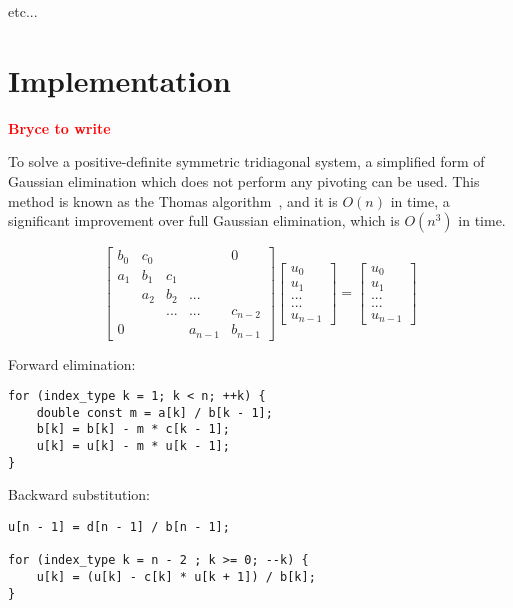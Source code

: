 \documentclass[conference]{IEEEtran}
\newcommand{\fix}[1]{{\bf \textcolor {red}{#1}}}
\begin{document}
etc...

\section{Implementation}
\fix{Bryce to write}

To solve a positive-definite symmetric tridiagonal system, a simplified form of Gaussian elimination which does not perform
any pivoting can be used. This method is known as the Thomas algorithm~\cite{},
and it is \(O(n)\) in time, a significant improvement over full Gaussian
elimination, which is \(O(n^3)\) in time.

\[
\begin{bmatrix}
b_0 & c_0 &     &         & 0       \\
a_1 & b_1 & c_1 &         &         \\
    & a_2 & b_2 & ...     &         \\
    &     & ... & ...     & c_{n-2} \\
0   &     &     & a_{n-1} & b_{n-1}
\end{bmatrix}
\begin{bmatrix}
u_0     \\
u_1     \\
...     \\
...     \\
u_{n-1}
\end{bmatrix}
=
\begin{bmatrix}
u_0     \\
u_1     \\
...     \\
...     \\
u_{n-1}
\end{bmatrix}
\]

Forward elimination:

\begin{lstlisting}
for (index_type k = 1; k < n; ++k) {
    double const m = a[k] / b[k - 1];
    b[k] = b[k] - m * c[k - 1];
    u[k] = u[k] - m * u[k - 1];
} 
\end{lstlisting}

Backward substitution:

\begin{lstlisting}
u[n - 1] = d[n - 1] / b[n - 1];

for (index_type k = n - 2 ; k >= 0; --k) {
    u[k] = (u[k] - c[k] * u[k + 1]) / b[k];
} 
\end{lstlisting}
\end{document}
